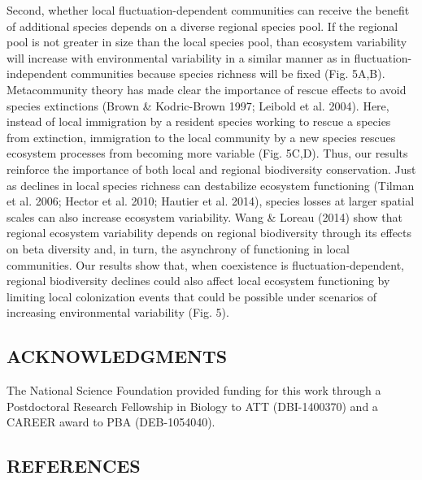 \documentclass[12pt,]{article}
\begin{document}
Second, whether local fluctuation-dependent communities can receive the
benefit of additional species depends on a diverse regional species
pool. If the regional pool is not greater in size than the local species
pool, than ecosystem variability will increase with environmental
variability in a similar manner as in fluctuation-independent
communities because species richness will be fixed (Fig. 5A,B).
Metacommunity theory has made clear the importance of rescue effects to
avoid species extinctions (Brown \& Kodric-Brown 1997; Leibold et al.
2004). Here, instead of local immigration by a resident species working
to rescue a species from extinction, immigration to the local community
by a new species rescues ecosystem processes from becoming more variable
(Fig. 5C,D). Thus, our results reinforce the importance of both local
and regional biodiversity conservation. Just as declines in local
species richness can destabilize ecosystem functioning (Tilman et al.
2006; Hector et al. 2010; Hautier et al. 2014), species losses at larger
spatial scales can also increase ecosystem variability. Wang \& Loreau
(2014) show that regional ecosystem variability depends on regional
biodiversity through its effects on beta diversity and, in turn, the
asynchrony of functioning in local communities. Our results show that,
when coexistence is fluctuation-dependent, regional biodiversity
declines could also affect local ecosystem functioning by limiting local
colonization events that could be possible under scenarios of increasing
environmental variability (Fig. 5).

\subsection{ACKNOWLEDGMENTS}\label{acknowledgments}

The National Science Foundation provided funding for this work through a
Postdoctoral Research Fellowship in Biology to ATT (DBI-1400370) and a
CAREER award to PBA (DEB-1054040).

\setlength{\parindent}{0ex} \singlespacing

\subsection*{REFERENCES}\label{references}
\end{document}
